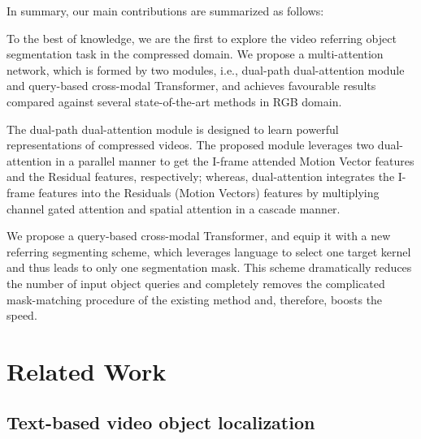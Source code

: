 \documentclass[sigconf]{acmart}
\begin{document}
In summary, our main contributions are summarized as follows:

 To the best of knowledge, we are the first to explore the video referring object segmentation task in the compressed domain. We propose a multi-attention network, which is formed by two modules, i.e., dual-path dual-attention module and query-based cross-modal Transformer, and achieves favourable results compared against several state-of-the-art methods in RGB domain.


 The dual-path dual-attention module is designed to learn powerful representations of compressed videos. The proposed module leverages two dual-attention in a parallel manner to get the I-frame attended Motion Vector features and the Residual features, respectively; whereas, dual-attention integrates the I-frame features into the Residuals (Motion Vectors) features by multiplying channel gated attention and spatial attention in a cascade manner.


 We propose a query-based cross-modal Transformer, and equip it with a new referring segmenting scheme, which leverages language to select one target kernel and thus leads to only one segmentation mask. This scheme dramatically reduces the number of input object queries and completely removes the complicated mask-matching procedure of the existing method and, therefore, boosts the speed.


\section{Related Work}

\subsection{Text-based video object localization}
\end{document}

